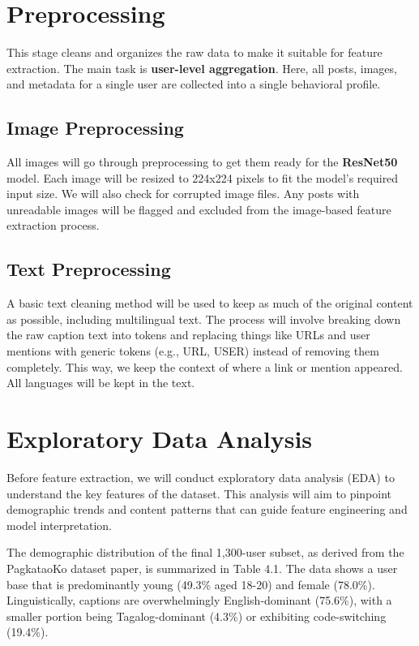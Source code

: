 \section{Preprocessing}
This stage cleans and organizes the raw data to make it suitable for feature extraction. The main task is \textbf{user-level aggregation}. Here, all posts, images, and metadata for a single user are collected into a single behavioral profile. 

\subsection{Image Preprocessing}
All images will go through preprocessing to get them ready for the \textbf{ResNet50} model. Each image will be resized to 224x224 pixels to fit the model’s required input size. We will also check for corrupted image files. Any posts with unreadable images will be flagged and excluded from the image-based feature extraction process.

\subsection{Text Preprocessing}
A basic text cleaning method will be used to keep as much of the original content as possible, including multilingual text. The process will involve breaking down the raw caption text into tokens and replacing things like URLs and user mentions with generic tokens (e.g., URL, USER) instead of removing them completely. This way, we keep the context of where a link or mention appeared. All languages will be kept in the text.


\section{Exploratory Data Analysis}
\label{subsec:eda}

Before feature extraction, we will conduct exploratory data analysis (EDA) to understand the key features of the dataset. This analysis will aim to pinpoint demographic trends and content patterns that can guide feature engineering and model interpretation.

The demographic distribution of the final 1,300-user subset, as derived from the PagkataoKo dataset paper, is summarized in Table 4.1. The data shows a user base that is predominantly young (49.3\% aged 18-20) and female (78.0\%). Linguistically, captions are overwhelmingly English-dominant (75.6\%), with a smaller portion being Tagalog-dominant (4.3\%) or exhibiting code-switching (19.4\%).

